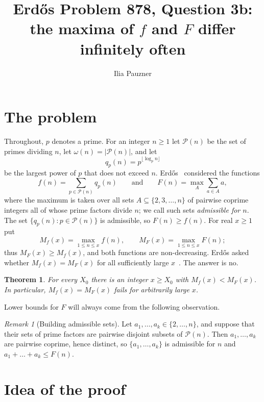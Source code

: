 \documentclass[11pt,a4paper]{amsart}
\title[Erd\H{o}s Problem 878, Question 3b]{Erd\H{o}s Problem 878, Question 3b:\\ the maxima of $f$ and $F$ differ infinitely often}
\author{Ilia Pauzner}
\date{}
\newtheorem*{theorem}{Theorem}
\theoremstyle{remark}
\newtheorem*{remark}{Remark}
\begin{document}
\maketitle

\section{The problem}

Throughout, $p$ denotes a prime. For an integer $n \ge 1$ let $\mathcal{P}(n)$ be the set of primes dividing $n$, let $\omega(n) = |\mathcal{P}(n)|$, and let
\[
q_p(n) = p^{\lfloor \log_p n \rfloor}
\]
be the largest power of $p$ that does not exceed $n$. Erd\H{o}s~\cite{Er84e} considered the functions
\[
f(n) = \sum_{p \in \mathcal{P}(n)} q_p(n)
\qquad\text{and}\qquad
F(n) = \max_A \sum_{a \in A} a,
\]
where the maximum is taken over all sets $A \subseteq \{2, 3, \dots, n\}$ of pairwise coprime integers all of whose prime factors divide $n$; we call such sets \emph{admissible for $n$}. The set $\{q_p(n) : p \in \mathcal{P}(n)\}$ is admissible, so $F(n) \ge f(n)$. For real $x \ge 1$ put
\[
M_f(x) = \max_{1 \le n \le x} f(n), \qquad M_F(x) = \max_{1 \le n \le x} F(n);
\]
thus $M_F(x) \ge M_f(x)$, and both functions are non-decreasing. Erd\H{o}s asked whether $M_f(x) = M_F(x)$ for all sufficiently large $x$~\cite{EP878}. The answer is no.

\begin{theorem}
For every $X_0$ there is an integer $x \ge X_0$ with $M_f(x) < M_F(x)$. In particular, $M_f(x) = M_F(x)$ fails for arbitrarily large $x$.
\end{theorem}

Lower bounds for $F$ will always come from the following observation.

\begin{remark}[Building admissible sets]
Let $a_1, \dots, a_k \in \{2, \dots, n\}$, and suppose that their sets of prime factors are pairwise disjoint subsets of $\mathcal{P}(n)$. Then $a_1, \dots, a_k$ are pairwise coprime, hence distinct, so $\{a_1, \dots, a_k\}$ is admissible for $n$ and $a_1 + \dots + a_k \le F(n)$.
\end{remark}

\section{Idea of the proof}
\end{document}
